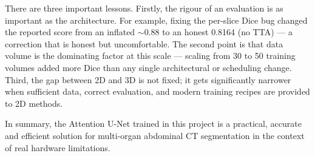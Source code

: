 There are three important lessons. Firstly, the rigour of an evaluation is as important as the architecture. For example, fixing the per-slice Dice bug changed the reported score from an inflated $\sim$0.88 to an honest 0.8164 (no TTA) --- a correction that is honest but uncomfortable. The second point is that data volume is the dominating factor at this scale --- scaling from 30 to 50 training volumes added more Dice than any single architectural or scheduling change. Third, the gap between 2D and 3D is not fixed; it gets significantly narrower when sufficient data, correct evaluation, and modern training recipes are provided to 2D methods.

In summary, the Attention U-Net trained in this project is a practical, accurate and efficient solution for multi-organ abdominal CT segmentation in the context of real hardware limitations.